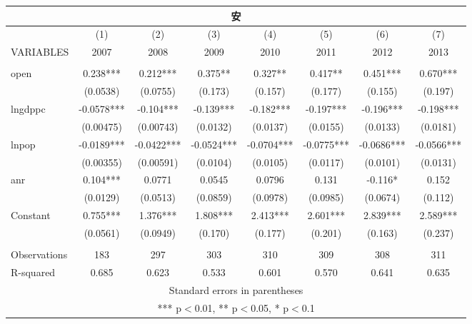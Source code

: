 \documentclass[]{article}
\begin{document}
\begin{tabular}{lccccccc}
\multicolumn{8}{c}{安} \\ \hline
 & (1) & (2) & (3) & (4) & (5) & (6) & (7) \\
VARIABLES & 2007 & 2008 & 2009 & 2010 & 2011 & 2012 & 2013 \\ \hline
 &  &  &  &  &  &  &  \\
open & 0.238*** & 0.212*** & 0.375** & 0.327** & 0.417** & 0.451*** & 0.670*** \\
 & (0.0538) & (0.0755) & (0.173) & (0.157) & (0.177) & (0.155) & (0.197) \\
lngdppc & -0.0578*** & -0.104*** & -0.139*** & -0.182*** & -0.197*** & -0.196*** & -0.198*** \\
 & (0.00475) & (0.00743) & (0.0132) & (0.0137) & (0.0155) & (0.0133) & (0.0181) \\
lnpop & -0.0189*** & -0.0422*** & -0.0524*** & -0.0704*** & -0.0775*** & -0.0686*** & -0.0566*** \\
 & (0.00355) & (0.00591) & (0.0104) & (0.0105) & (0.0117) & (0.0101) & (0.0131) \\
anr & 0.104*** & 0.0771 & 0.0545 & 0.0796 & 0.131 & -0.116* & 0.152 \\
 & (0.0129) & (0.0513) & (0.0859) & (0.0978) & (0.0985) & (0.0674) & (0.112) \\
Constant & 0.755*** & 1.376*** & 1.808*** & 2.413*** & 2.601*** & 2.839*** & 2.589*** \\
 & (0.0561) & (0.0949) & (0.170) & (0.177) & (0.201) & (0.163) & (0.237) \\
 &  &  &  &  &  &  &  \\
Observations & 183 & 297 & 303 & 310 & 309 & 308 & 311 \\
 R-squared & 0.685 & 0.623 & 0.533 & 0.601 & 0.570 & 0.641 & 0.635 \\ \hline
\multicolumn{8}{c}{ Standard errors in parentheses} \\
\multicolumn{8}{c}{ *** p$<$0.01, ** p$<$0.05, * p$<$0.1} \\
\end{tabular}
\end{document}

